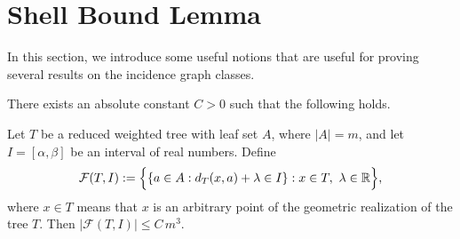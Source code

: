 \documentclass[a4paper,UKenglish,cleveref,autoref,thm-restate]{socg-lipics-v2021}
\begin{document}
\section{Shell Bound Lemma
}
\label{app:ssb}

In this section, we introduce some useful notions that are useful for proving several results on the incidence graph classes.

\begin{lemma}\label{lem:single-shell-bound_app}
There exists an absolute constant \(C>0\) such that the following holds.

Let \(T\) be a reduced weighted tree with leaf set \(A\), where \(|A|=m\), and let
\(I=[\alpha,\beta]\) be an interval of real numbers. Define
\[
\mathcal F(T,I):=
\Bigl\{
\{a\in A:d_T(x,a)+\lambda\in I\}: x\in T,\ \lambda\in\mathbb R
\Bigr\},
\]
where \(x\in T\) means that \(x\) is an arbitrary point of the geometric realization of
the tree \(T\). Then
\(
|\mathcal F(T,I)|\le C\,m^3.
\)
\end{lemma}
\end{document}
